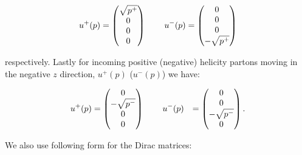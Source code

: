	\begin{align}
	    u^+(p) = \begin{pmatrix}
	           \sqrt{p^+} \\
	           0 \\
	           0 \\
	           0 \\
	         \end{pmatrix}\hspace{0.75cm}
	    u^-(p) = \begin{pmatrix}
	           0 \\
	           0 \\
	           0 \\
	           -\sqrt{p^+} \\
	         \end{pmatrix}
	\end{align}

	respectively.  Lastly for incoming positive (negative) helicity partons moving in the negative $z$ direction,
	$u^+(p)$ ($u^-(p)$) we have:

	\begin{align}
	    u^+(p) &= \begin{pmatrix}
	           0 \\
	           -\sqrt{p^-} \\
	           0 \\
	           0 \\
	         \end{pmatrix}\hspace{0.75cm}
	    u^-(p) &= \begin{pmatrix}
	           0 \\
	           0 \\
	           -\sqrt{p^-} \\
	           0 \\
	         \end{pmatrix}.
	\end{align}

	We also use following form for the Dirac matrices:

